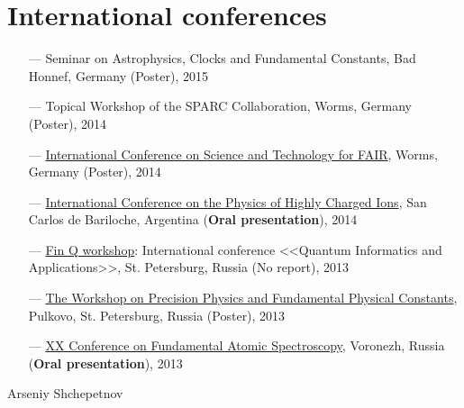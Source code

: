 \documentclass[10pt,a4paper]{article}
\begin{document}
	\section*{International conferences}
		\begin{itemize}
			\item[---]	Seminar on Astrophysics, Clocks and Fundamental Constants, Bad Honnef, Germany (Poster), 2015
			\item[---]	Topical Workshop of the SPARC Collaboration, Worms, Germany (Poster), 2014
			\item[---]	\href{http://indico.gsi.de/conferenceDisplay.py?confId=2443}{International Conference on Science and Technology for FAIR}, Worms, Germany (Poster), 2014
			\item[---]	\href{http://www.cab.cnea.gov.ar/hci2014/}{International Conference on the Physics of Highly Charged Ions}, San Carlos de Bariloche, Argentina (\textbf{Oral presentation}), 2014
			\item[---]	\href{https://sites.google.com/site/finqinternational/home}{Fin Q workshop}: International conference <<Quantum Informatics and Applications>>, St. Petersburg, Russia (No report), 2013
			\item[---]	\href{http://www.gao.spb.ru/russian/psas/ffk2013/}{The Workshop on Precision Physics and Fundamental Physical Constants}, Pulkovo, St. Petersburg, Russia (Poster), 2013
			\item[---]	\href{http://fas.vsu.ru/en/index.php}{XX Conference on Fundamental Atomic Spectroscopy}, Voronezh, Russia (\textbf{Oral presentation}), 2013
		\end{itemize}		
	
	\vspace{3cm}
	
	Arseniy Shchepetnov
	
	
	
	
\end{document}
